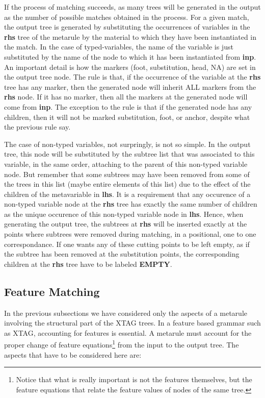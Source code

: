 If the process of matching succeeds, as many trees will be generated in the 
output as the number of possible matches obtained in the process. For a 
given match, the output tree is generated by substituting the occurrences of variables in the {\bf rhs} tree 
of the metarule by the material to which they have 
been instantiated in the match. In the case of typed-variables, 
the name of the variable is just substituted by the name of the node to which 
it has been instantiated from {\bf inp}. An important detail is how the 
markers (foot, substitution, head, NA) are set in the output tree 
node. The rule is that, if the occurrence of the variable at the {\bf rhs} 
tree has any marker, then the generated node will inherit ALL 
markers from the {\bf rhs} node. If it has no marker, then all the markers 
at the generated node will come from {\bf inp}. The exception to the rule is 
that if the generated node has any children, then it will not be marked 
substitution, foot, or anchor, despite what the previous rule say. 
 
The case of non-typed variables, not surpringly, is not so simple.  In the 
output tree, this node will be substituted by the subtree list that was 
associated to this variable, in the same order, attaching to the parent of this 
non-typed variable node.  But remember that some subtrees may have been removed 
from some of the trees in this list (maybe entire elements of this list) due to 
the effect of the children of the metavariable in {\bf lhs}.  It is a 
requirement that any occurence of a non-typed variable node at the {\bf rhs} 
tree has exactly the same number of children as the unique occurence of this 
non-typed variable node in {\bf lhs}. Hence, when generating the output tree, 
the subtrees at {\bf rhs} will be inserted exactly at the points where subtrees 
were removed during matching, in a positional, one to one correspondance. If 
one wants any of these cutting points to be left empty, as if the subtree has 
been removed at the substitution points, the corresponding children at the {\bf rhs} tree have to be labeled {\bf EMPTY}. 
 
\subsection{Feature Matching} 
 
In the previous subsections we have considered only the aspects of a metarule 
involving the structural part of the XTAG trees. In a feature based grammar 
such as XTAG, accounting for features is essential. A metarule must account for 
the proper change of feature equations\footnote{Notice that what is really important is not the features themselves, but the feature equations that relate the feature values of nodes of the same tree.} from the input to the output 
tree.  The aspects that have to be considered here are: 
 
